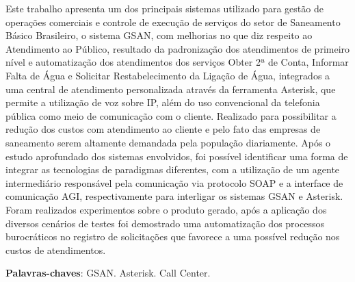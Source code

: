 \setlength{\absparsep}{18pt} %
\begin{resumo}
 
Este trabalho apresenta um dos principais sistemas utilizado para gestão de operações comerciais e controle de execução de serviços do setor de Saneamento Básico Brasileiro, o sistema GSAN, com melhorias no que diz respeito ao Atendimento ao Público, resultado da padronização dos atendimentos de primeiro nível e automatização dos atendimentos dos serviços Obter 2ª de Conta, Informar Falta de Água e Solicitar Restabelecimento da Ligação de Água, integrados a uma central de atendimento personalizada através da ferramenta Asterisk, que permite a utilização de voz sobre IP, além do uso convencional da telefonia pública como meio de comunicação com o cliente. Realizado para possibilitar a redução dos custos com atendimento ao cliente e pelo fato das empresas de saneamento serem altamente demandada pela população diariamente. Após o estudo aprofundado dos sistemas envolvidos, foi possível identificar uma forma de integrar as tecnologias de paradigmas diferentes, com a utilização de um agente intermediário responsável pela comunicação via protocolo SOAP e a interface de comunicação AGI, respectivamente para interligar os sistemas GSAN e Asterisk.  Foram realizados experimentos sobre o produto gerado, após a aplicação dos diversos cenários de testes foi demostrado uma automatização dos processos burocráticos no registro de solicitações que favorece a uma possível redução nos custos de atendimentos.


 \textbf{Palavras-chaves}: GSAN. Asterisk. Call Center.
\end{resumo}